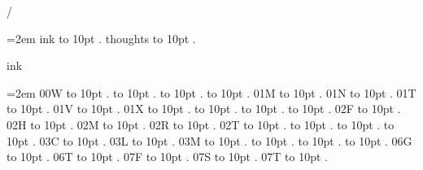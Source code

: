 
\parindent=0pt
\pdfpagewidth=148mm
\pdfpageheight=210mm
\hsize=128mm
\vsize=190mm
\pdfhorigin=0pt
\pdfvorigin=0pt
\hoffset=10mm
\voffset=10mm
/
\par\begingroup
\leftskip=2em
\smallskip
ink \leaders\hbox to 10pt {\hss.\hss}  \hfill {}
\smallskip
thoughts \leaders\hbox to 10pt {\hss.\hss}  \hfill {}
\smallskip
\medskip
\par\endgroup
\bigskip
{}
ink
\par\begingroup
\leftskip=2em
\smallskip
\medskip
00W \leaders\hbox to 10pt {\hss.\hss}  \hfill {}
 \leaders\hbox to 10pt {\hss.\hss}  \hfill {}
 \leaders\hbox to 10pt {\hss.\hss}  \hfill {}
 \leaders\hbox to 10pt {\hss.\hss}  \hfill {}
\smallskip
01M \leaders\hbox to 10pt {\hss.\hss}  \hfill {}
\smallskip
01N \leaders\hbox to 10pt {\hss.\hss}  \hfill {}
\smallskip
01T \leaders\hbox to 10pt {\hss.\hss}  \hfill {}
\smallskip
01V \leaders\hbox to 10pt {\hss.\hss}  \hfill {}
\smallskip
01X \leaders\hbox to 10pt {\hss.\hss}  \hfill {}
 \leaders\hbox to 10pt {\hss.\hss}  \hfill {}
 \leaders\hbox to 10pt {\hss.\hss}  \hfill {}
 \leaders\hbox to 10pt {\hss.\hss}  \hfill {}
\smallskip
02F \leaders\hbox to 10pt {\hss.\hss}  \hfill {}
\smallskip
02H \leaders\hbox to 10pt {\hss.\hss}  \hfill {}
\smallskip
02M \leaders\hbox to 10pt {\hss.\hss}  \hfill {}
\smallskip
02R \leaders\hbox to 10pt {\hss.\hss}  \hfill {}
\smallskip
02T \leaders\hbox to 10pt {\hss.\hss}  \hfill {}
 \leaders\hbox to 10pt {\hss.\hss}  \hfill {}
 \leaders\hbox to 10pt {\hss.\hss}  \hfill {}
 \leaders\hbox to 10pt {\hss.\hss}  \hfill {}
\smallskip
03C \leaders\hbox to 10pt {\hss.\hss}  \hfill {}
\smallskip
03L \leaders\hbox to 10pt {\hss.\hss}  \hfill {}
\smallskip
03M \leaders\hbox to 10pt {\hss.\hss}  \hfill {}
 \leaders\hbox to 10pt {\hss.\hss}  \hfill {}
 \leaders\hbox to 10pt {\hss.\hss}  \hfill {}
 \leaders\hbox to 10pt {\hss.\hss}  \hfill {}
\smallskip
06G \leaders\hbox to 10pt {\hss.\hss}  \hfill {}
\smallskip
06T \leaders\hbox to 10pt {\hss.\hss}  \hfill {}
\smallskip
07F \leaders\hbox to 10pt {\hss.\hss}  \hfill {}
\smallskip
07S \leaders\hbox to 10pt {\hss.\hss}  \hfill {}
\smallskip
07T \leaders\hbox to 10pt {\hss.\hss}  \hfill {}
